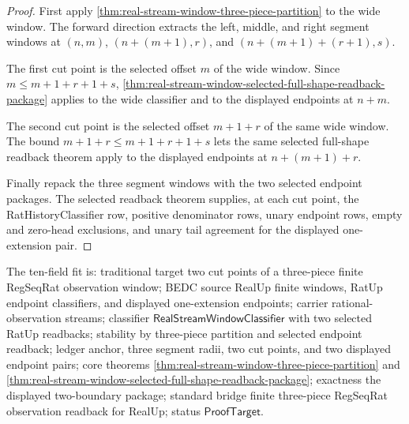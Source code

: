 \begin{proof}
First apply \autoref{thm:real-stream-window-three-piece-partition} to the
wide window. The forward direction extracts the left, middle, and right
segment windows at $(n,m)$, $(n+(m+1),r)$, and
$(n+(m+1)+(r+1),s)$.

The first cut point is the selected offset $m$ of the wide window. Since
$m\le m+1+r+1+s$,
\autoref{thm:real-stream-window-selected-full-shape-readback-package}
applies to the wide classifier and to the displayed endpoints at $n+m$.

The second cut point is the selected offset $m+1+r$ of the same wide window.
The bound $m+1+r\le m+1+r+1+s$ lets the same selected full-shape readback
theorem apply to the displayed endpoints at $n+(m+1)+r$.

Finally repack the three segment windows with the two selected endpoint
packages. The selected readback theorem supplies, at each cut point, the
RatHistoryClassifier row, positive denominator rows, unary endpoint rows,
empty and zero-head exclusions, and unary tail agreement for the displayed
one-extension pair.
\end{proof}

The ten-field fit is: traditional target two cut points of a three-piece
finite RegSeqRat observation window; BEDC source RealUp finite windows, RatUp
endpoint classifiers, and displayed one-extension endpoints; carrier
rational-observation streams; classifier $\mathsf{RealStreamWindowClassifier}$
with two selected RatUp readbacks; stability by three-piece partition and
selected endpoint readback; ledger anchor, three segment radii, two cut
points, and two displayed endpoint pairs; core theorems
\autoref{thm:real-stream-window-three-piece-partition} and
\autoref{thm:real-stream-window-selected-full-shape-readback-package};
exactness the displayed two-boundary package; standard bridge finite
three-piece RegSeqRat observation readback for RealUp; status
$\mathsf{ProofTarget}$.

